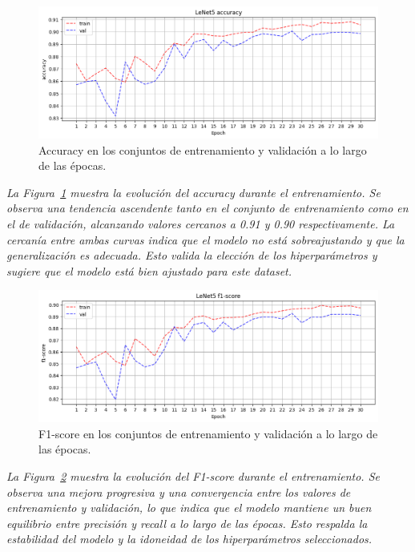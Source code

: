 \documentclass[conference]{IEEEtran}
\begin{document}
\begin{figure}[H]
    \centering
    \includegraphics[width=0.95\linewidth]{graphics-raw-da/raw-da-accuracy-train_val.png}
    \caption{Accuracy en los conjuntos de entrenamiento y validación a lo largo de las épocas.}
    \label{fig:raw-da-accuracy-train_val}
\end{figure}
\noindent\textit{
La Figura~\ref{fig:raw-da-accuracy-train_val} muestra la evolución del accuracy durante el entrenamiento. Se observa una tendencia ascendente tanto en el conjunto de entrenamiento como en el de validación, alcanzando valores cercanos a 0.91 y 0.90 respectivamente. La cercanía entre ambas curvas indica que el modelo no está sobreajustando y que la generalización es adecuada. Esto valida la elección de los hiperparámetros y sugiere que el modelo está bien ajustado para este dataset.
}

\begin{figure}[H]
    \centering
    \includegraphics[width=0.95\linewidth]{graphics-raw-da/raw-da-f1score-train_val.png}
    \caption{F1-score en los conjuntos de entrenamiento y validación a lo largo de las épocas.}
    \label{fig:raw-da-f1score-train_val}
\end{figure}
\noindent\textit{
La Figura~\ref{fig:raw-da-f1score-train_val} muestra la evolución del F1-score durante el entrenamiento. Se observa una mejora progresiva y una convergencia entre los valores de entrenamiento y validación, lo que indica que el modelo mantiene un buen equilibrio entre precisión y recall a lo largo de las épocas. Esto respalda la estabilidad del modelo y la idoneidad de los hiperparámetros seleccionados.
}
\end{document}
